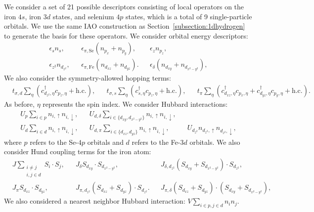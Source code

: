 We consider a set of 21 possible descriptors consisting of local operators on the iron $4s$, iron $3d$ states, and selenium $4p$ states, which is a total of 9 single-particle orbitals.
We use the same IAO construction as Section~\ref{subsection:1dhydrogen} to generate the basis for these operators.
We consider orbital energy descriptors: 
\begin{align}
  &\epsilon_{s} n_s,&
  &\epsilon_{\pi,\mathrm{Se}} (n_{p_x} + n_{p_y}), &
  &\epsilon_{z} n_{p_z},&
  \\
  &\epsilon_{z^2} n_{d_{z^2}},& 
  &\epsilon_{\pi,\mathrm{Fe}} (n_{d_{xz}} + n_{d_{yz}}).& 
  &\epsilon_{\delta} (n_{d_{xy}} + n_{d_{x^2-y^2}}),&
\end{align}
We also consider the symmetry-allowed hopping terms:
\begin{align}
  &t_{\sigma,d} \sum_{\eta} \left( c_{d_{z^2},\eta}^{\dagger} c_{p_z,\eta} + \text{h.c.} \right),&
  &t_{\sigma,s} \sum_{\eta} \left(c_{s,\eta}^{\dagger}  c_{p_z,\eta} + \text{h.c.} \right),&
  &t_{\pi} \sum_{\eta} \left(c_{d_{xz},\eta}^{\dagger}  c_{p_x,\eta} + c_{d_{yz},\eta}^{\dagger}  c_{p_y,\eta} + \text{h.c.} \right).&
\end{align}
As before, $\eta$ represents the spin index.
We consider Hubbard interactions:
\begin{align}
  &U_p \sum_{i \in p} n_{i,\uparrow} n_{i,\downarrow},&
  &U_{d,\delta} \sum_{i\in \{d_{xy},d_{x^2-y^2}\}} n_{i,\uparrow} n_{i,\downarrow},&
  \\
  &U_d \sum_{i \in d} n_{i,\uparrow} n_{i,\downarrow},&
  &U_{d,\pi} \sum_{i\in \{d_{xz},d_{yz}\}} n_{i,\uparrow} n_{i,\downarrow},&
  &U_{d_{z^2}} n_{d_{z^2},\uparrow} n_{d_{z^2},\downarrow},&
\end{align}
where $p$ refers to the Se-$4p$ orbitals and $d$ refers to the Fe-$3d$ orbitals. 
We also consider Hund coupling terms for the iron atom:
\begin{align}
  &J \sum_{\substack{i\ne j \\i,j \in d}} S_i \cdot S_j,&
  &J_{\delta} S_{d_{xy}} \cdot S_{d_{x^2-y^2}},&
  &J_{\delta,d_{z^2}} (S_{d_{xy}} + S_{d_{x^2-y^2}}) \cdot S_{d_{z^2}},& \label{eqn:hund1}
  \\
  &J_{\pi} S_{d_{xz}} \cdot S_{d_{yz}},&
  &J_{\pi,d_{z^2}} (S_{d_{xz}} + S_{d_{yz}}) \cdot S_{d_{z^2}}.&
  &J_{\pi,\delta} (S_{d_{xz}} + S_{d_{yz}}) \cdot (S_{d_{xy}} + S_{d_{x^2-y^2}}),&
\end{align}
We also considered a nearest neighbor Hubbard interaction: $V \sum_{i\in p, j\in d} n_{i} n_j$.


